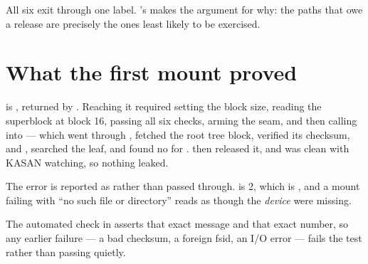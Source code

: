 All six exit through one  label. 's
 makes the argument for why: the paths that owe a
release are precisely the ones least likely to be exercised.

\section{What the first mount proved}

\begin{quote}
\end{quote}

 is , returned by .
Reaching it required setting the block size, reading the superblock at block
16, passing all six checks, arming the seam, and then calling into
 --- which went through , fetched the
root tree block, verified its checksum,  and ,
searched the leaf, and found no  for
.  then released it, and
 was clean with KASAN watching, so nothing leaked.

The error is reported as  rather than passed through.
 is 2, which is , and a mount failing with
``no such file or directory'' reads as though the \emph{device} were missing.

The automated check in  asserts that exact message and that
exact number, so any earlier failure --- a bad checksum, a foreign fsid, an I/O
error --- fails the test rather than passing quietly.

